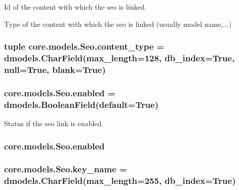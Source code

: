 Id of the content with which the seo is linked. 

Type of the content with which the seo is linked (usually model name,...) \hypertarget{classcore_1_1models_1_1Seo_ac102fd07ac9043d0b8f84fd7079e4eb0}{
\subsubsection[{content\-\_\-type}]{\setlength{\rightskip}{0pt plus 5cm}tuple core.\-models.\-Seo.\-content\-\_\-type = dmodels.\-Char\-Field(max\-\_\-length=128, db\-\_\-index=True, null=True, blank=True)\hspace{0.3cm}{\ttfamily [static]}}}\label{classcore_1_1models_1_1Seo_ac102fd07ac9043d0b8f84fd7079e4eb0}
\hypertarget{classcore_1_1models_1_1Seo_a7c32328ad2bf566ea1902cbe0d9c541c}{
\subsubsection[{enabled}]{\setlength{\rightskip}{0pt plus 5cm}core.\-models.\-Seo.\-enabled = dmodels.\-Boolean\-Field(default=True)\hspace{0.3cm}{\ttfamily [static]}}}\label{classcore_1_1models_1_1Seo_a7c32328ad2bf566ea1902cbe0d9c541c}


Status if the seo link is enabled. 

\hypertarget{classcore_1_1models_1_1Seo_a7c32328ad2bf566ea1902cbe0d9c541c}{
\subsubsection[{enabled}]{\setlength{\rightskip}{0pt plus 5cm}core.\-models.\-Seo.\-enabled}}\label{classcore_1_1models_1_1Seo_a7c32328ad2bf566ea1902cbe0d9c541c}
\hypertarget{classcore_1_1models_1_1Seo_a644a0f17aaa68dc004c064e4f8be688d}{
\subsubsection[{key\-\_\-name}]{\setlength{\rightskip}{0pt plus 5cm}core.\-models.\-Seo.\-key\-\_\-name = dmodels.\-Char\-Field(max\-\_\-length=255, db\-\_\-index=True)\hspace{0.3cm}{\ttfamily [static]}}}\label{classcore_1_1models_1_1Seo_a644a0f17aaa68dc004c064e4f8be688d}


